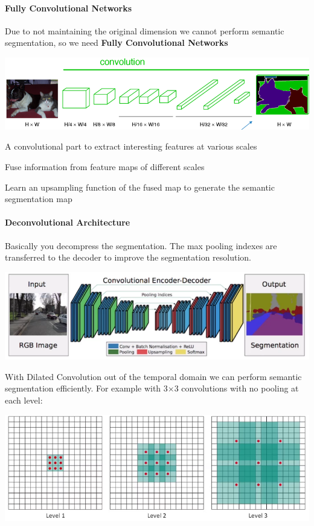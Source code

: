\documentclass[10pt]{report}
\begin{document}
\paragraph{Fully Convolutional Networks} Due to not maintaining the original dimension we cannot perform semantic segmentation, so we need \textbf{Fully Convolutional Networks}
\begin{center}
	\includegraphics[scale=0.5]{72.png}
\end{center}
\begin{list}{}{}
	\item A convolutional part to extract interesting features at various scales
	\item Fuse information from feature maps of different scales
	\item Learn an upsampling function of the fused map to generate the semantic segmentation map
\end{list}
\pagebreak
\paragraph{Deconvolutional Architecture} Basically you decompress the segmentation. The max pooling indexes are transferred to the decoder to improve the segmentation resolution.
\begin{center}
	\includegraphics[scale=0.5]{73.png}
\end{center}
With Dilated Convolution out of the temporal domain we can perform semantic segmentation efficiently. For example with 3$\times$3 convolutions with no pooling at each level:
\begin{center}
	\includegraphics[scale=0.5]{74.png}
\end{center}
\end{document}

